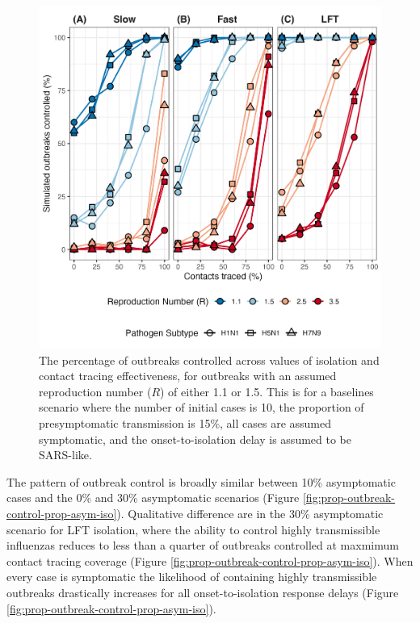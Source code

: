\documentclass{article}
\begin{document}
\begin{figure}[ht]
\centering
\includegraphics[width=\textwidth]{../plots/prop_outbreak_control_reproduction_number.png}
\caption{The percentage of outbreaks controlled across values of isolation and contact tracing effectiveness, for outbreaks with an assumed reproduction number ($R$) of either 1.1 or 1.5. This is for a baselines scenario where the number of initial cases is 10, the proportion of presymptomatic transmission is 15\%, all cases are assumed symptomatic, and the onset-to-isolation delay is assumed to be SARS-like.}
\label{fig:prop-outbreak-control-R}
\end{figure}

\clearpage

The pattern of outbreak control is broadly similar between 10\% asymptomatic cases and the 0\% and 30\% asymptomatic scenarios (Figure \ref{fig:prop-outbreak-control-prop-asym-iso}). Qualitative difference are in the 30\% asymptomatic scenario for LFT isolation, where the ability to control highly transmissible influenzas reduces to less than a quarter of outbreaks controlled at maxmimum contact tracing coverage (Figure \ref{fig:prop-outbreak-control-prop-asym-iso}). When every case is symptomatic the likelihood of containing highly transmissible outbreaks drastically increases for all onset-to-isolation response delays (Figure \ref{fig:prop-outbreak-control-prop-asym-iso}). \\
\end{document}
